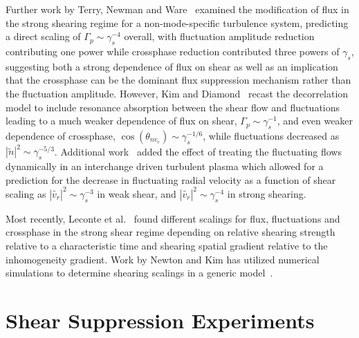\documentclass[aip,pop,amsmath,amssymb,preprint,superscriptaddress]{revtex4-1} %
\begin{document}
Further work by Terry, Newman and Ware~\cite{terry01} examined the modification of flux in the strong shearing regime for a non-mode-specific turbulence system, predicting a direct scaling of $\Gamma_{p} \sim \gamma_{s}^{-4}$ overall, with fluctuation amplitude reduction contributing one power while crossphase reduction contributed three powers of $\gamma_s$, suggesting both a strong dependence of flux on shear as well as an implication that the crossphase can be the dominant flux suppression mechanism rather than the fluctuation amplitude. However, Kim and Diamond~\cite{kim03} recast the decorrelation model to include resonance absorption between the shear flow and fluctuations leading to a much weaker dependence of flux on shear, $\Gamma_{p} \sim \gamma_{s}^{-1}$, and even weaker dependence of crossphase, $\cos(\theta_{nv_{r}}) \sim \gamma_{s}^{-1/6}$, while fluctuations decreased as $|\tilde{n}|^{2} \sim \gamma_{s}^{-5/3}$. Additional work~\cite{kim04} added the effect of treating the fluctuating flows dynamically in an interchange driven turbulent plasma which allowed for a prediction for the decrease in fluctuating radial velocity as a function of shear scaling as $|\tilde{v_{r}}|^{2} \sim \gamma_{s}^{-3}$ in weak shear, and $|\tilde{v_{r}}|^{2} \sim \gamma_{s}^{-4}$ in strong shearing.

Most recently, Leconte et al.~\cite{leconte06} found different scalings for flux, fluctuations and crossphase in the strong shear regime depending on relative shearing strength relative to a characteristic time and shearing spatial gradient relative to the inhomogeneity gradient. Work by Newton and Kim has utilized numerical simulations to determine shearing scalings in a generic model~\cite{newton07,newton11}.

\section{Shear Suppression Experiments}
\end{document}
